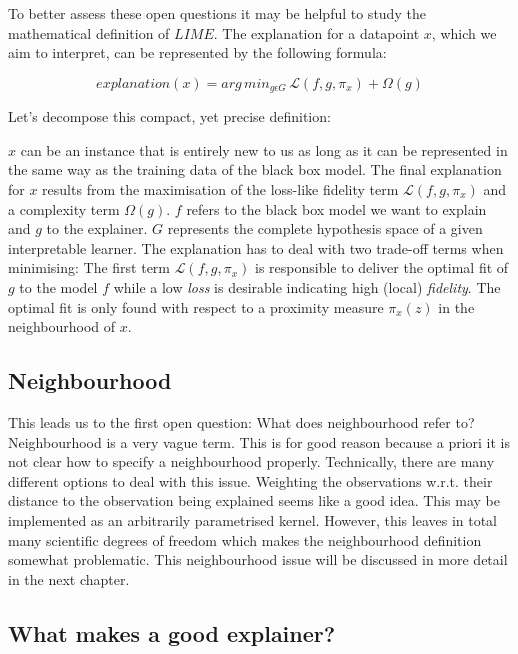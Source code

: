 \documentclass[]{krantz}
\begin{document}
To better assess these open questions it may be helpful to study the
mathematical definition of \(LIME\). The explanation for a datapoint
\(x\), which we aim to interpret, can be represented by the following
formula:

\[explanation\left(x\right) = arg\,min_{g \epsilon G} \,\mathcal{L}\left(f, g, \pi_x \right) + \Omega\left(g\right)\]

Let's decompose this compact, yet precise definition:

\(x\) can be an instance that is entirely new to us as long as it can be
represented in the same way as the training data of the black box model.
The final explanation for \(x\) results from the maximisation of the
loss-like fidelity term \(\mathcal{L}\left(f, g, \pi_x \right)\) and a
complexity term \(\Omega\left(g\right)\). \(f\) refers to the black box
model we want to explain and \(g\) to the explainer. \(G\) represents
the complete hypothesis space of a given interpretable learner. The
explanation has to deal with two trade-off terms when minimising: The
first term \(\mathcal{L}\left(f, g, \pi_x \right)\) is responsible to
deliver the optimal fit of \(g\) to the model \(f\) while a low
\emph{loss} is desirable indicating high (local) \emph{fidelity}. The
optimal fit is only found with respect to a proximity measure
\(\pi_x(z)\) in the neighbourhood of \(x\).

\subsection{Neighbourhood}\label{neighbourhood}

This leads us to the first open question: What does neighbourhood refer
to? Neighbourhood is a very vague term. This is for good reason because
a priori it is not clear how to specify a neighbourhood properly.
Technically, there are many different options to deal with this issue.
Weighting the observations w.r.t. their distance to the observation
being explained seems like a good idea. This may be implemented as an
arbitrarily parametrised kernel. However, this leaves in total many
scientific degrees of freedom which makes the neighbourhood definition
somewhat problematic. This neighbourhood issue will be discussed in more
detail in the next chapter.

\subsection{What makes a good
explainer?}\label{what-makes-a-good-explainer}
\end{document}
